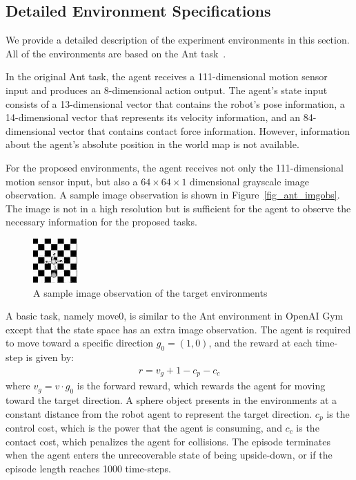 
\subsection{Detailed Environment Specifications}
We provide a detailed description of the experiment environments in this section. All of the environments are based on the Ant task~\cite{openaigym}. 

In the original Ant task, the agent receives a 111-dimensional motion sensor input and produces an 8-dimensional action output. The agent's state input consists of a 13-dimensional vector that contains the robot's pose information, a 14-dimensional vector that represents its velocity information, and an 84-dimensional vector that contains contact force information. However, information about the agent's absolute position in the world map is not available.

For the proposed environments, the agent receives not only the 111-dimensional motion sensor input, but also a $64\times 64\times 1$ dimensional grayscale image observation. A sample image observation is shown in Figure~\ref{fig_ant_imgobs}. The image is not in a high resolution but is sufficient for the agent to observe the necessary information for the proposed tasks.

\begin{figure}[H]
	\includegraphics{images/ant_imgobs.png}
	\centering
	\caption{A sample image observation of the target environments}
\end{figure}\label{fig_ant_imgobs}

A basic task, namely move0, is similar to the Ant environment in OpenAI Gym~\cite{openaigym} except that the state space has an extra image observation. The agent is required to move toward a specific direction $g_0=(1,0)$, and the reward at each time-step is given by:
\begin{align}
r = v_g + 1-c_p-c_c
\end{align}
where $v_g=v \cdot g_0$ is the forward reward, which rewards the agent for moving toward the target direction. A sphere object presents in the environments at a constant distance from the robot agent to represent the target direction.  $c_p$ is the control cost, which is the power that the agent is consuming, and $c_c$ is the contact cost, which penalizes the agent for collisions. The episode terminates when the agent enters the unrecoverable state of being upside-down, or if the episode length reaches 1000 time-steps.

